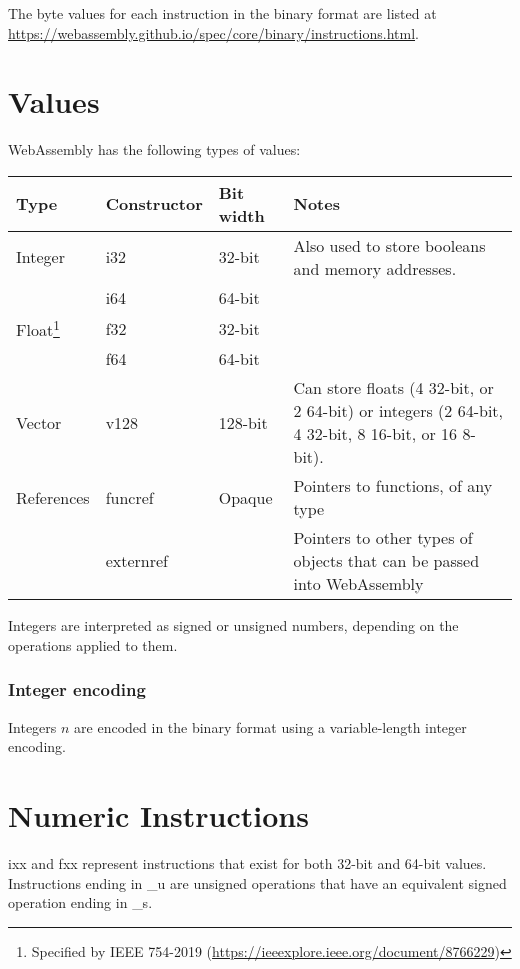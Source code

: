 \documentclass[10pt,a4paper]{article}
\begin{document}
The byte values for each instruction in the binary format are listed at \url{https://webassembly.github.io/spec/core/binary/instructions.html}.

\section*{Values}

WebAssembly has the following types of values:

\begin{tabularx}{\textwidth}{l>{\sffamily}llX}
\toprule
\textbf{Type} & \normalfont\textbf{Constructor} & \textbf{Bit width} & \textbf{Notes} \\
\midrule
Integer & i32 & 32-bit & Also used to store booleans and memory addresses. \\
& i64 & 64-bit \\
Float\footnote{Specified by IEEE 754-2019 (\url{https://ieeexplore.ieee.org/document/8766229})} & f32 & 32-bit \\
& f64 & 64-bit \\
Vector & v128 & 128-bit & Can store floats (4 32-bit, or 2 64-bit) or integers (2 64-bit, 4 32-bit, 8 16-bit, or 16 8-bit). \\
References & funcref & Opaque & Pointers to functions, of any type \\
& externref & & Pointers to other types of objects that can be passed into WebAssembly \\
\bottomrule
\end{tabularx}

Integers are interpreted as signed or unsigned numbers, depending on the operations applied to them.

\subsubsection*{Integer encoding}

Integers $n$ are encoded in the binary format using a variable-length integer encoding.


\section*{Numeric Instructions}

\textsf{ixx} and \textsf{fxx} represent instructions that exist for both 32-bit and 64-bit values. Instructions ending in \textsf{\_u} are unsigned operations that have an equivalent signed operation ending in \textsf{\_s}.
\end{document}

